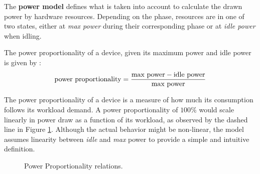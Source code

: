The \textbf{power model} defines what is taken into account to calculate the drawn power by hardware resources.
Depending on the phase, resources are in one of two states, either at \textit{max power} during their corresponding phase or at \textit{idle power} when idling. 

\begin{definition}
	The power proportionality of a device, given its \textnormal{maximum power} and \textnormal{idle power} is given by :
$$\textnormal{power proportionality} = \frac{\textnormal{max power} - \textnormal{idle power}}{\textnormal{max power}} $$
\end{definition}
The power proportionality of a device is a measure of how much its consumption follows its workload demand.
A power proportionality of $100\%$ would scale linearly in power draw as a function of its workload, as observed by the dashed line in Figure \ref{fig:GraphPowProp}.
Although the actual behavior might be non-linear, the model assumes linearity between \textit{idle} and \textit{max} power to provide a simple and intuitive definition.  

\begin{figure}[t]
	\centering
	\caption{Power Proportionality relations.}\label{fig:GraphPowProp}
\end{figure}


